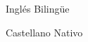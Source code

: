 
\begin{cvskills}

  \cvskill
    {Inglés} %
    {Bilingüe} %

  \cvskill
    {Castellano} %
    {Nativo} %
    
\end{cvskills}
